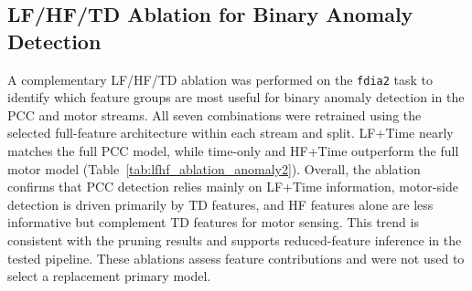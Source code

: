\documentclass[letterpaper,journal]{IEEEtran}
\begin{document}
\subsection{LF/HF/TD Ablation for Binary Anomaly Detection}
\label{sec:lfhf_ablation}

A complementary LF/HF/TD ablation was performed on the \texttt{fdia2} task to identify which feature groups are most useful for binary anomaly detection in the PCC and motor streams. All seven combinations were retrained using the selected full-feature architecture within each stream and split. LF+Time nearly matches the full PCC model, while time-only and HF+Time outperform the full motor model (Table~\ref{tab:lfhf_ablation_anomaly2}). Overall, the ablation confirms that PCC detection relies mainly on LF+Time information, motor-side detection is driven primarily by TD features, and HF features alone are less informative but complement TD features for motor sensing. This trend is consistent with the pruning results and supports reduced-feature inference in the tested pipeline. These ablations assess feature contributions and were not used to select a replacement primary model.
\end{document}
